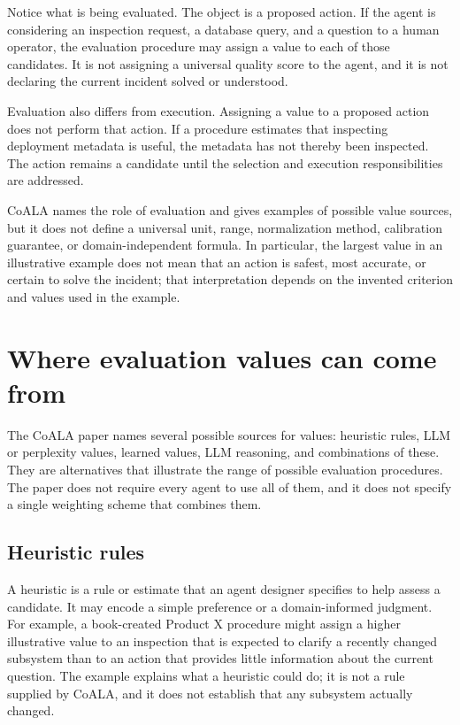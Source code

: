 Notice what is being evaluated. The object is a proposed action. If the agent is considering an inspection request, a database query, and a question to a human operator, the evaluation procedure may assign a value to each of those candidates. It is not assigning a universal quality score to the agent, and it is not declaring the current incident solved or understood.

Evaluation also differs from execution. Assigning a value to a proposed action does not perform that action. If a procedure estimates that inspecting deployment metadata is useful, the metadata has not thereby been inspected. The action remains a candidate until the selection and execution responsibilities are addressed.

\begin{notebox}
CoALA names the role of evaluation and gives examples of possible value sources, but it does not define a universal unit, range, normalization method, calibration guarantee, or domain-independent formula. In particular, the largest value in an illustrative example does not mean that an action is safest, most accurate, or certain to solve the incident; that interpretation depends on the invented criterion and values used in the example.
\end{notebox}

\section{Where evaluation values can come from}
\label{sec:evaluation-value-sources}

The CoALA paper names several possible sources for values: heuristic rules, LLM or perplexity values, learned values, LLM reasoning, and combinations of these. They are alternatives that illustrate the range of possible evaluation procedures. The paper does not require every agent to use all of them, and it does not specify a single weighting scheme that combines them.

\subsection{Heuristic rules}

A heuristic is a rule or estimate that an agent designer specifies to help assess a candidate. It may encode a simple preference or a domain-informed judgment. For example, a book-created Product X procedure might assign a higher illustrative value to an inspection that is expected to clarify a recently changed subsystem than to an action that provides little information about the current question. The example explains what a heuristic could do; it is not a rule supplied by CoALA, and it does not establish that any subsystem actually changed.

